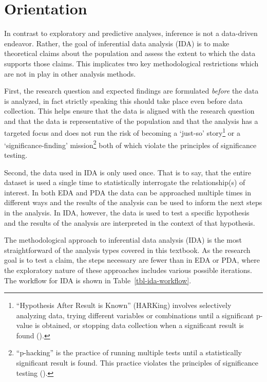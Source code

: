 \documentclass[
  letterpaper,
]{latex/krantz}
\theoremstyle{definition}
\theoremstyle{remark}
\begin{document}
\section{Orientation}\label{sec-ida-orientation}

In contrast to exploratory and predictive analyses, inference is not a
data-driven endeavor. Rather, the goal of inferential data analysis
(IDA) is to make theoretical claims about the population and assess the
extent to which the data supports those claims. This implicates two key
methodological restrictions which are not in play in other analysis
methods.

First, the research question and expected findings are formulated
\emph{before} the data is analyzed, in fact strictly speaking this
should take place even before data collection. This helps ensure that
the data is aligned with the research question and that the data is
representative of the population and that the analysis has a targeted
focus and does not run the risk of becoming a `just-so' story\footnote{``Hypothesis
  After Result is Known'' (HARKing) involves selectively analyzing data,
  trying different variables or combinations until a significant p-value
  is obtained, or stopping data collection when a significant result is
  found ().} or a
`significance-finding' mission\footnote{``p-hacking'' is the practice of
  running multiple tests until a statistically significant result is
  found. This practice violates the principles of significance testing
  ().} both of which violate
the principles of significance testing.

Second, the data used in IDA is only used once. That is to say, that the
entire dataset is used a single time to statistically interrogate the
relationship(s) of interest. In both EDA and PDA the data can be
approached multiple times in different ways and the results of the
analysis can be used to inform the next steps in the analysis. In IDA,
however, the data is used to test a specific hypothesis and the results
of the analysis are interpreted in the context of that hypothesis.

The methodological approach to inferential data analysis (IDA) is the
most straightforward of the analysis types covered in this textbook. As
the research goal is to test a claim, the steps necessary are fewer than
in EDA or PDA, where the exploratory nature of these approaches includes
various possible iterations. The workflow for IDA is shown in
Table~\ref{tbl-ida-workflow}.
\end{document}
